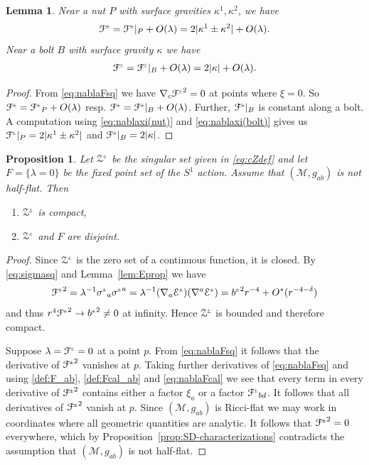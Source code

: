 \documentclass[a4paper,10pt,reqno]{amsart}
\newcommand{\nut}{P}
\newcommand{\bolt}{B}
\newcommand{\cE}{\mathcal{E}}
\newcommand{\cZ}{\mathcal{Z}}
\newcommand{\cM}{\mathcal{M}}
\newcommand{\cF}{\mathcal{F}}
\theoremstyle{plain}
\newtheorem{lemma}[thm]{Lemma}
\newtheorem{prop}[thm]{Proposition}
\newcommand{\PM}[1]{{{#1}^{\hspace{-.5pt}\scaleto{\pm}{3.5pt}}}}
\def\Fcal{\mathcal{F}}
\numberwithin{equation}{section}
\newcommand{\Fixed}{F}
\begin{document}
\begin{lemma} 
\label{lem:Fcalprop} 
Near a nut $\nut$ with surface gravities $\kappa^1, \kappa^2$, we have
\begin{align}
\PM{\Fcal} 
= \PM{\Fcal}|_\nut + O(\lambda)
= 2|\kappa^1 \pm \kappa^2| + O(\lambda).
\end{align}
Near a bolt $\bolt$ with surface gravity $\kappa$ we have 
\begin{align}
\PM{\Fcal} 
= \PM{\Fcal}|_\bolt + O(\lambda)
= 2|\kappa| + O(\lambda).
\end{align}
\end{lemma} 

\begin{proof} 
From \eqref{eq:nablaFsq} we have $\nabla_{c}\PM{\Fcal}^2 = 0$ at points where $\xi=0$. So $\PM{\Fcal} = \PM{\Fcal}_\nut + O(\lambda)$ resp. $\PM{\Fcal} = \PM{\Fcal}|_\bolt + O(\lambda)$. Further, $\PM{\Fcal}|_\bolt$ is constant along a bolt. A computation using \eqref{eq:nablaxi(nut)} and \eqref{eq:nablaxi(bolt)} gives us $\PM{\Fcal}|_\nut = 2|\kappa^1 \pm \kappa^2|$ and $\PM{\Fcal}|_\bolt = 2|\kappa|$.
\end{proof}

\begin{prop} \label{prop:cZ-properties}
Let $\PM{\cZ}$ be the singular set given in \eqref{eq:cZdef} and let $\Fixed = \{ \lambda = 0 \}$ be the fixed point set of the $S^1$ action.  Assume that $(\cM, g_{ab})$ is not half-flat. Then
\begin{enumerate}
\item $\PM{\cZ}$ is compact,
\item $\PM{\cZ}$ and $\Fixed$ are disjoint.
\end{enumerate}
\end{prop}

\begin{proof}
Since $\PM{\cZ}$ is the zero set of a continuous function, it is closed. By \eqref{eq:sigmasq} and Lemma~\ref{lem:Eprop} we have
\begin{align} \label{Fcalasymp}
\PM{\Fcal}^2
= \lambda^{-1} \PM{\sigma}_{a} \PM{\sigma}^{a}
= \lambda^{-1}(\nabla_a\PM{\cE})(\nabla^a\PM{\cE})
=\PM{b}^2 r^{-4} + O^*(r^{-4-\delta})
\end{align}
and thus $r^4 \PM{\Fcal}^2 \to \PM{b}^2 \neq 0$ at infinity. Hence $\PM{\cZ}$ is bounded and therefore compact.

Suppose $\lambda = \PM{\Fcal} = 0$ at a point $p$. From \eqref{eq:nablaFsq} it follows that the derivative of $\PM{\Fcal}^2$ vanishes at $p$. Taking further derivatives of \eqref{eq:nablaFsq} and using \eqref{def:F_ab}, \eqref{def:Fcal_ab} and \eqref{eq:nablaFcal} we see that every term in every derivative of $\PM{\Fcal}^2$ contains either a factor $\xi_a$ or a factor $\PM\cF_{bd}$. It follows that all derivatives of $\PM{\Fcal}^2$ vanish at $p$. Since $(\cM, g_{ab})$ is Ricci-flat we may work in coordinates where all geometric quantities are analytic. It follows that $\PM{\Fcal}^2 = 0$ everywhere, which by Proposition~\ref{prop:SD-characterizations} contradicts the assumption that $(\cM, g_{ab})$ is not half-flat.
\end{proof}
\end{document}

